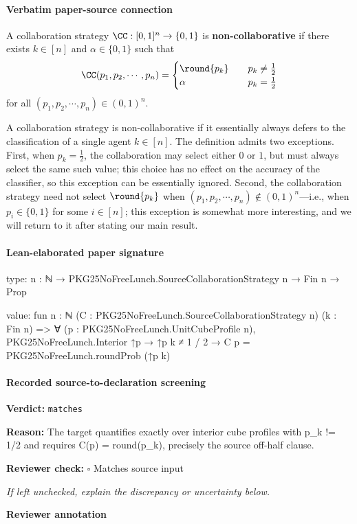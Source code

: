 \documentclass[10pt]{article}
\newcommand{\reviewerbox}{%
  \par\noindent\fbox{\parbox{0.96\linewidth}{\rule{0pt}{0.38in}}}\par
}
\newcommand{\reviewmatch}[1]{%
  \par\noindent\textbf{Reviewer check:} $\square$\; #1\par
  \noindent\emph{If left unchecked, explain the discrepancy or uncertainty below.}\par
}
\begin{document}
\paragraph{Verbatim paper-source connection}
\begin{ReviewVerbatim}
\begin{definition}\label{def:non-collaborative}
    A collaboration strategy $\CC:[0,1]^n\rightarrow \{0,1\}$ is \textbf{non-collaborative} if there exists $k\in [n]$ and $\alpha\in \{0,1\}$ such that
    \begin{equation}
    \CC(p_1,p_2,\cdots,p_n) =
        \begin{cases}
        \round{p_k} &\quad \text{$p_k\neq \frac{1}{2}$} \\
            \alpha &\quad \text{$p_k=\frac{1}{2}$}
        \end{cases}
    \end{equation}
    for all $(p_1,p_2,\cdots,p_n)\in (0,1)^n$.
\end{definition}

A collaboration strategy is non-collaborative if it essentially always defers to the classification of a single agent $k\in [n]$. The definition admits two exceptions. First, when $p_k = \frac{1}{2}$, the collaboration may select either $0$ or $1$, but must always select the same such value; this choice has no effect on the accuracy of the classifier, so this exception can be essentially ignored. Second, the collaboration strategy need not select $\round{p_k}$ when $(p_1,p_2,\cdots,p_n)\notin (0,1)^n$---i.e., when $p_i\in \{0,1\}$ for some $i\in [n]$; this exception is somewhat more interesting, and we will return to it after stating our main result.
\end{ReviewVerbatim}



\paragraph{Lean-elaborated paper signature}
\begin{ReviewVerbatim}
type:
{n : ℕ} → PKG25NoFreeLunch.SourceCollaborationStrategy n → Fin n → Prop

value:
fun {n : ℕ} (C : PKG25NoFreeLunch.SourceCollaborationStrategy n) (k : Fin n) =>
  ∀ (p : PKG25NoFreeLunch.UnitCubeProfile n),
    PKG25NoFreeLunch.Interior ↑p → ↑p k ≠ 1 / 2 → C p = PKG25NoFreeLunch.roundProb (↑p k)
\end{ReviewVerbatim}


\paragraph{Recorded source-to-declaration screening}
\textbf{Verdict:} \texttt{matches}
\\
{\raggedright
\textbf{Reason:} The target quantifies exactly over interior cube profiles with p\_\allowbreak{}k != 1/\allowbreak{}2 and requires C(p) = round(p\_\allowbreak{}k), precisely the source off-\allowbreak{}half clause.\allowbreak{}
\par}
\reviewmatch{Matches source input}
\noindent\textbf{Reviewer annotation}\par
\reviewerbox
\clearpage
\hypertarget{paper-prerequisite-88a840f53df1cf52}{}
\end{document}
